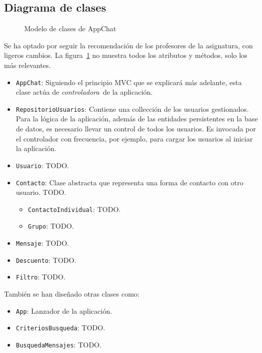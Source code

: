 \documentclass[11pt]{article}
\begin{document}
\subsection{Diagrama de clases}

\begin{figure}[H]
	\centering
	\scalebox{0.425}{
		
	}
	\caption{Modelo de clases de AppChat}
	\label{fig:modelo}
\end{figure}

Se ha optado por seguir la recomendación de los profesores de la asignatura, con ligeros cambios. La figura~\ref{fig:modelo} no muestra todos los atributos y métodos, solo los más relevantes.

\begin{itemize}
	\item \texttt{AppChat}: Siguiendo el principio MVC que se explicará más adelante, esta clase actúa de \guillemotleft \textit{controladora}\guillemotright \ de la aplicación.
	\item \texttt{RepositorioUsuarios}: Contiene una collección de los usuarios gestionados. Para la lógica de la aplicación, además de las entidades persistentes en la base de datos, es necesario llevar un control de todos los usuarios. Es invocada por el controlador con frecuencia, por ejemplo, para cargar los usuarios al iniciar la aplicación.
	\item \texttt{Usuario}: TODO.
	\item \texttt{Contacto}: Clase abstracta que representa una forma de contacto con otro usuario. TODO.
	\begin{itemize}
		\item \texttt{ContactoIndividual}: TODO.
		\item \texttt{Grupo}: TODO.
	\end{itemize}
	\item \texttt{Mensaje}: TODO.
	\item \texttt{Descuento}: TODO.
	\item \texttt{Filtro}: TODO.
\end{itemize}

También se han diseñado otras clases como:

\begin{itemize}
	\item \texttt{App}: Lanzador de la aplicación.
	\item \texttt{CriteriosBusqueda}: TODO.
	\item \texttt{BusquedaMensajes}: TODO.
\end{itemize}
\end{document}
